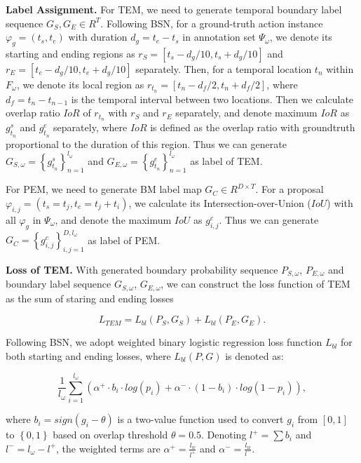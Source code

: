 \documentclass[10pt,twocolumn,letterpaper]{article}
\begin{document}
\noindent
\textbf{Label Assignment.}
For TEM, we need to generate temporal boundary label sequence $G_S, G_E \in R^T$.
Following BSN\cite{lin2018bsn}, for a ground-truth action instance $\varphi_g=( t_{s},t_{e} )$ with duration $d_g=t_e-t_s$ in annotation set $\Psi_{\omega}$, we denote its starting and ending regions as $r_S=[ t_s-d_g/10,t_s+d_g/10 ]$ and $r_E= [ t_e-d_g/10,t_e+d_g/10 ]$ separately. 
Then, for a temporal location $t_n$ within $F_{\omega}$, we denote its local region as $r_{t_n}=[ t_n-d_f/2,t_n+d_f/2 ]$, where $d_f=t_{n}-t_{n-1}$ is the temporal interval between two locations. 
Then we calculate overlap ratio $IoR$ of $r_{t_n}$ with $r_S$ and $r_E$ separately, and denote maximum $IoR$ as $g^s_{t_n}$ and $g^e_{t_n}$ separately, where $IoR$ is defined as the overlap
ratio with groundtruth proportional to the duration of this region.
Thus we can generate $G_{S,\omega} = \left \{ g^s_{t_n} \right \}_{n=1}^{l_{\omega }} $
 and $G_{E,\omega} = \left \{ g^e_{t_n} \right \}_{n=1}^{l_{\omega }} $ as label of TEM.


For PEM, we need to generate BM  label map $G_C \in R^{D \times T}$.
For a proposal $\varphi_{i,j} =(t_s = t_j, t_e = t_j + t_i)$, we calculate its Intersection-over-Union ($IoU$) with all $\varphi_g$ in $\Psi_{\omega}$, and denote the maximum $IoU$ as $g^c_{i,j}$.
Thus we can generate $G_C = \left \{ g^c_{i,j} \right \}_{i,j=1}^{D,l_{\omega }} $ as label of PEM.

\noindent
\textbf{Loss of TEM.}
With generated boundary probability sequence $P_{S,\omega}$, $P_{E,\omega}$ and boundary label sequence $G_{S,\omega}$, $G_{E,\omega}$, we can construct the  loss function of TEM  as the sum of staring and ending losses

\begin{equation}
L_{TEM}= L_{bl}(P_{S},G_{S})+   L_{bl}(P_{E},G_{E}).
\end{equation}

Following BSN\cite{lin2018bsn}, we adopt weighted binary logistic regression loss function $L_{bl}$ for both starting and ending losses, where $L_{bl}(P,G)$ is denoted as:

\begin{small}
\begin{equation}
\frac{1}{l_\omega}\sum_{i=1}^{l_\omega} \left (\alpha^{+}\cdot b_i\cdot  log(p_i)+\alpha^{-} \cdot (1-b_i) \cdot log(1-p_i) \right ),
\end{equation}
\end{small}
where $b_i=sign(g_i-\theta)$ is a two-value function used to convert  $g_i$ from $[ 0,1 ]$ to $\left \{0,1  \right \}$ based on  overlap threshold $\theta = 0.5$.  
Denoting $l^+=\sum b_i$ and $l^-=l_\omega -l^+ $, the weighted terms are $\alpha^+=\frac{l_w}{l^+}$ and $\alpha^-=\frac{l_w}{l^-}$.
\end{document}
